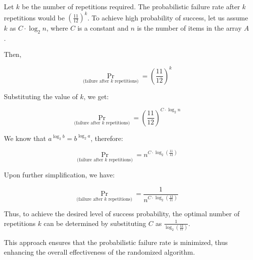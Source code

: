     Let \(k\) be the number of repetitions required. The probabilistic failure rate after \(k\) repetitions would be \(\left(\frac{11}{12}\right)^k\). To achieve high probability of success, let us assume \(k\) as \(C \cdot \log_{2}n\), where \(C\) is a constant and \(n\) is the number of items in the array \(A\).

    Then,

    \[
        \Pr_{\text{(failure after } k \text{ repetitions)}} = \left(\frac{11}{12}\right)^k
    \]

    Substituting the value of \(k\), we get:

    \[
        \Pr_{\text{(failure after } k \text{ repetitions)}} = \left(\frac{11}{12}\right)^{C \cdot \log_{2}n}
    \]

    We know that \(a^{\log_{2}b} = b^{\log_{2}a}\), therefore:

    \[
        \Pr_{\text{(failure after } k \text{ repetitions)}} = n^{C \cdot \log_{2} \left(\frac{11}{12}\right)}
    \]

    Upon further simplification, we have:

    \[
        \Pr_{\text{(failure after } k \text{ repetitions)}} = \frac{1}{n^{C \cdot \log_{2} \left(\frac{12}{11}\right)}}
    \]

    Thus, to achieve the desired level of success probability, the optimal number of repetitions \(k\) can be determined by substituting \(C\) as \(\frac{1}{\log_{2} \left(\frac{12}{11}\right)}\).
    
    This approach ensures that the probabilistic failure rate is minimized, thus enhancing the overall effectiveness of the randomized algorithm.